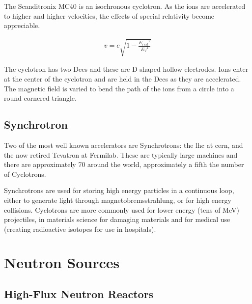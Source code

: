 The Scanditronix MC40 is an isochronous cyclotron.  As the ions are accelerated to higher and higher velocities, the effects of special relativity become appreciable.

\begin{equation}
\begin{split}
v = c \sqrt{1 - \frac{{E_{rest}}^2}{{E_V}^2}}
\end{split}
\label{eq:eqGammaFunction}
\end{equation}

The cyclotron has two Dees and these are D shaped hollow electrodes.  Ions enter at the center of the cyclotron and are held in the Dees as they are accelerated.  The magnetic field is varied to bend the path of the ions from a circle into a round cornered triangle.




\FloatBarrier
\subsection{Synchrotron}

Two of the most well known accelerators are Synchrotrons: the \acrlong{lhc} at \acrlong{cern}, and the now retired Tevatron at Fermilab.  These are typically large machines and there are approximately 70 around the world\cite{synchrotrons}, approximately a fifth the number of Cyclotrons.  

Synchrotrons are used for storing high energy particles in a continuous loop, either to generate light through magnetobremsstrahlung, or for high energy collisions.  Cyclotrons are more commonly used for lower energy (tens of MeV) projectiles, in materials science for damaging materials and for medical use (creating radioactive isotopes for use in hospitals).












\FloatBarrier
\section{Neutron Sources}

\FloatBarrier
\subsection{High-Flux Neutron Reactors}

